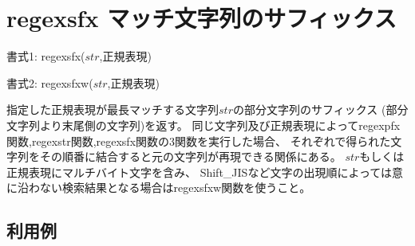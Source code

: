 
%

\section{regexsfx マッチ文字列のサフィックス\label{sect:regexsfx}}

書式1: regexsfx($str$,正規表現)

書式2: regexsfxw($str$,正規表現)

指定した正規表現が最長マッチする文字列$str$の部分文字列のサフィックス
(部分文字列より末尾側の文字列)を返す。
同じ文字列及び正規表現によってregexpfx関数,regexstr関数,regexsfx関数の3関数を実行した場合、
それぞれで得られた文字列をその順番に結合すると元の文字列が再現できる関係にある。
$str$もしくは正規表現にマルチバイト文字を含み、
Shift\_JISなど文字の出現順によっては意に沿わない検索結果となる場合はregexsfxw関数を使うこと。

\subsection*{利用例}


%

